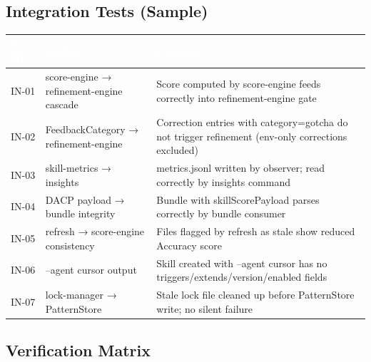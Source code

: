 \documentclass[11pt,letterpaper]{article}
\newcommand{\tableheader}[1]{\textbf{\sffamily\textcolor{white}{#1}}}
\begin{document}
\subsection{Integration Tests (Sample)}

\begin{center}
\begin{tabularx}{\textwidth}{C{1.5cm}L{5cm}X}
\toprule
{}
\tableheader{Test ID} & \tableheader{Verifies} & \tableheader{Expected} \\
\midrule
IN-01 & score-engine → refinement-engine cascade & Score computed by score-engine feeds correctly into refinement-engine gate \\
IN-02 & FeedbackCategory → refinement-engine & Correction entries with category=gotcha do not trigger refinement (env-only corrections excluded) \\
IN-03 & skill-metrics → insights & metrics.jsonl written by observer; read correctly by insights command \\
IN-04 & DACP payload → bundle integrity & Bundle with skillScorePayload parses correctly by bundle consumer \\
IN-05 & refresh → score-engine consistency & Files flagged by refresh as stale show reduced Accuracy score \\
IN-06 & --agent cursor output & Skill created with --agent cursor has no triggers/extends/version/enabled fields \\
IN-07 & lock-manager → PatternStore & Stale lock file cleaned up before PatternStore write; no silent failure \\
\bottomrule
\end{tabularx}
\end{center}

\subsection{Verification Matrix}
\end{document}
